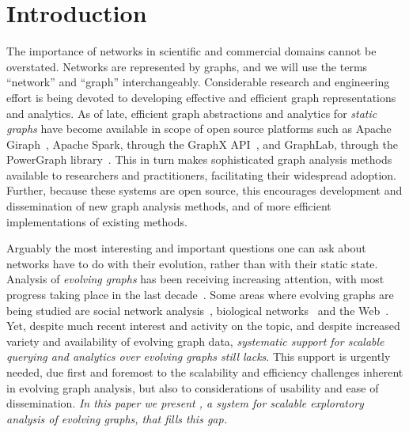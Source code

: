 \section{Introduction}
\label{sec:intro}

The importance of networks in scientific and commercial domains cannot
be overstated.  Networks are represented by graphs, and we will use
the terms ``network'' and ``graph'' interchangeably.  Considerable
research and engineering effort is being devoted to developing
effective and efficient graph representations and analytics.  As of
late, efficient graph abstractions and analytics for {\em static
  graphs} have become available in scope of open source platforms such
as Apache Giraph~\cite{ApacheGiraph}, Apache Spark, through the GraphX
API~\cite{DBLP:conf/osdi/GonzalezXDCFS14}, and GraphLab, through the
PowerGraph library~\cite{DBLP:conf/osdi/GonzalezLGBG12}.  This in turn
makes sophisticated graph analysis methods available to researchers
and practitioners, facilitating their widespread adoption.  Further,
because these systems are open source, this encourages development and
dissemination of new graph analysis methods, and of more efficient
implementations of existing methods.

Arguably the most interesting and important questions one can ask
about networks have to do with their evolution, rather than with their
static state.  Analysis of {\em evolving graphs} has been receiving
increasing attention, with most progress taking place in the last
decade~\cite{DBLP:journals/csur/AggarwalS14,Chan2008,Kan2009,DBLP:journals/tos/MiaoHLWYZPCC15,Ren2011,Semertzidis2015}.
Some areas where evolving graphs are being studied are social network
analysis~\cite{DBLP:conf/kdd/LeskovecBKT08,DBLP:conf/icml/SarkarCJ12},
biological networks~\cite{DBLP:journals/tcsb/BeyerTLSF10} and the Web~\cite{DBLP:journals/jisa/PapadimitriouDG10}.
%
Yet, despite much recent interest and activity on the topic, and
despite increased variety and availability of evolving graph data,
{\em systematic support for scalable querying and analytics over
  evolving graphs still lacks}.  This support is urgently needed, due
first and foremost to the scalability and efficiency challenges
inherent in evolving graph analysis, but also to considerations of
usability and ease of dissemination.  {\em In this paper we present
  \ql, a system for scalable exploratory analysis of evolving graphs,
  that fills this gap.}

